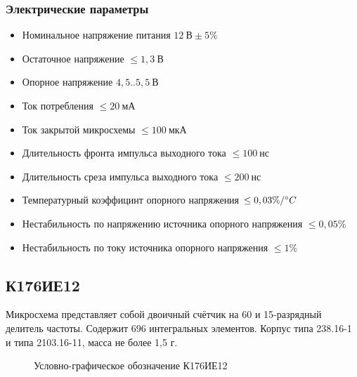 \subsubsection*{Электрические параметры}
\begin{itemize}
	\item[] Номинальное напряжение питания \dotfill $12~\text{В} \pm 5\%$
	\item[] Остаточное напряжение \dotfill $\leq 1,3~\text{В}$
	\item[] Опорное напряжение \dotfill $4,5..5,5~\text{В}$
	\item[] Ток потребления \dotfill $\leq 20~\text{мА}$
	\item[] Ток закрытой микросхемы \dotfill $\leq 100~\text{мкА}$
	\item[] Длительность фронта импульса выходного тока \dotfill $\leq 100~\text{нс}$
	\item[] Длительность среза импульса выходного тока \dotfill $\leq 200~\text{нс}$
	\item[] Температурный коэффицинт опорного напряжения \dotfill $\leq 0,03 \%/\degree C$
	\item[] Нестабильность по напряжению источника опорного напряжения \dotfill $\leq 0,05\%$
	\item[] Нестабильность по току источника опорного напряжения \dotfill $\leq 1\%$
\end{itemize}

\subsection*{К176ИЕ12}

Микросхема представляет собой двоичный счётчик на 60 и 15-разрядный делитель частоты. Содержит 696 интегральных элементов. Корпус типа 238.16-1 и типа 2103.16-11, масса не более 1,5 г. \\

\begin{figure}[ht]
  
  \caption{Условно-графическое обозначение К176ИЕ12}
  \label{img:k176ie12}
\end{figure}

